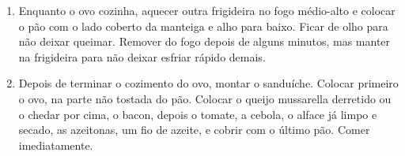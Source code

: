 {\begin{enumerate}
		      dourar um pouco. Tomar cuidado para não queimar.
		\item Enquanto o ovo cozinha, aquecer outra frigideira no fogo médio-alto e
		      colocar o pão com o lado coberto da manteiga e alho para baixo. Ficar de
		      olho para não deixar queimar. Remover do fogo depois de alguns minutos, mas
		      manter na frigideira para não deixar esfriar rápido demais.
    \item Depois de terminar o cozimento do ovo, montar o sanduíche. Colocar
          primeiro o ovo, na parte não tostada do pão. Colocar o queijo
          mussarella derretido ou o chedar por cima, o bacon, depois o tomate, a
          cebola, o alface já limpo e secado, as azeitonas, um fio de azeite, e
          cobrir com o último pão. Comer imediatamente.
	\end{enumerate}
	 
}
